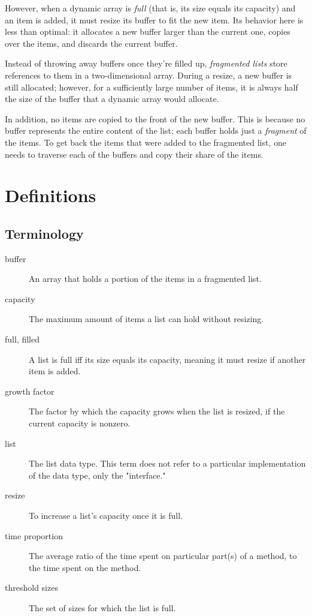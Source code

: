 \documentclass{article}
\begin{document}
	However, when a dynamic array is \textit{full} (that is, its size equals its capacity) and an item is added, it must resize its buffer to fit the new item. Its behavior here is less than optimal: it allocates a new buffer larger than the current one, copies over the items, and discards the current buffer.
	
	Instead of throwing away buffers once they're filled up, \textit{fragmented lists} store references to them in a two-dimensional array. During a resize, a new buffer is still allocated; however, for a sufficiently large number of items, it is always half the size of the buffer that a dynamic array would allocate.
	
	In addition, no items are copied to the front of the new buffer. This is because no buffer represents the entire content of the list; each buffer holds just a \textit{fragment} of the items. To get back the items that were added to the fragmented list, one needs to traverse each of the buffers and copy their share of the items.
	

	\section{Definitions}
	\label{Definitions}
	
	\subsection{Terminology}
	
	\begin{description}
		\item[buffer] An array that holds a portion of the items in a fragmented list.
		\item[capacity] The maximum amount of items a list can hold without resizing.
		\item[full, filled] A list is full iff its size equals its capacity, meaning it must resize if another item is added.
		\item[growth factor] The factor by which the capacity grows when the list is resized, if the current capacity is nonzero.
		\item[list] The list data type. This term does not refer to a particular implementation of the data type, only the "interface."
		\item[resize] To increase a list's capacity once it is full.
		\item[time proportion] The average ratio of the time spent on particular part(s) of a method, to the time spent on the method.
		\item[threshold sizes] The set of sizes for which the list is full.
	\end{description}
\end{document}
